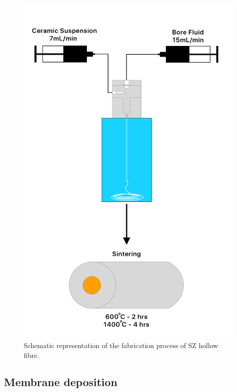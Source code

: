 \begin{figure}
    \includegraphics[width=\linewidth]{figures/hollowfibresintering.png}
    \caption{Schematic representation of the fabrication process of SZ hollow fibre.}
    \label{sintering}
  \end{figure}
  
\subsection{Membrane deposition}
